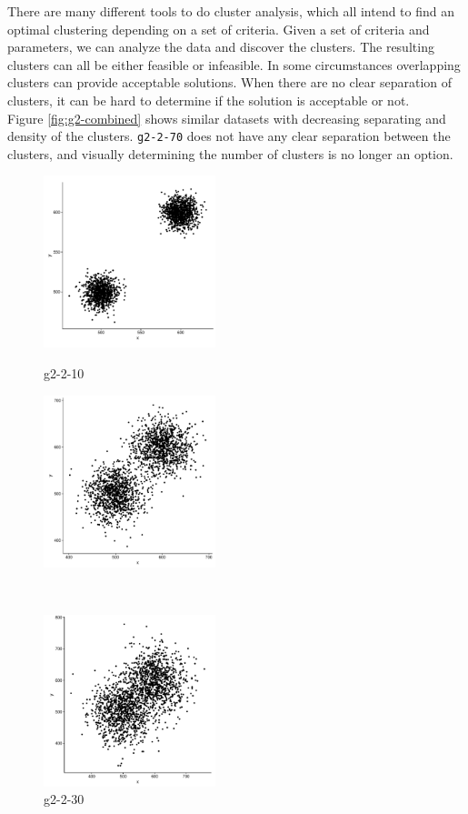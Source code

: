 \documentclass[a4paper,10pt]{article}
\theoremstyle{plain}
\theoremstyle{definition}
\begin{document}
There are many different tools to do cluster analysis, which all intend to find an optimal clustering depending on a set of criteria. Given a set of criteria and parameters, we can analyze the data and discover the clusters. The resulting clusters can all be either feasible or infeasible. In some circumstances overlapping clusters can provide acceptable solutions. When there are no clear separation of clusters, it can be hard to determine if the solution is acceptable or not.\\
Figure \ref{fig:g2-combined} shows similar datasets with decreasing separating and density of the clusters. \texttt{g2-2-70} does not have any clear separation between the clusters, and visually determining the number of clusters is no longer an option.
\begin{figure}[H]
	\centering
	\begin{minipage}{5cm}
		\includegraphics[width=5cm]{./pictures/G2/g2-2-10.pdf}
		\caption*{g2-2-10}
		\label{g2-2-10}
	\end{minipage}
	\begin{minipage}{5cm}
		\includegraphics[width=5cm]{./pictures/G2/g2-2-30.pdf}
		\caption*{g2-2-30}
		\label{g2-2-30}
	\end{minipage}
	\\
	\begin{minipage}{5cm}
		\includegraphics[width=5cm]{./pictures/G2/g2-2-50.pdf}

\end{minipage}
\end{figure}
\end{document}
